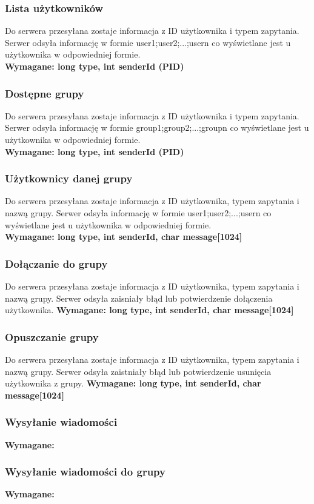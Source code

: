 \documentclass[11pt]{article}
\begin{document}
	\subsubsection{Lista użytkowników}
	Do serwera przesyłana zostaje informacja z ID użytkownika i typem zapytania. Serwer odsyła informację w formie user1;user2;...;usern co wyświetlane jest u użytkownika w odpowiedniej formie.\\
	\textbf{Wymagane: long type, int senderId (PID)}
	\subsubsection{Dostępne grupy}
	Do serwera przesyłana zostaje informacja z ID użytkownika i typem zapytania. Serwer odsyła informację w formie group1;group2;...;groupn co wyświetlane jest u użytkownika w odpowiedniej formie.\\
	\textbf{Wymagane: long type, int senderId (PID)}
	\subsubsection{Użytkownicy danej grupy}
	Do serwera przesyłana zostaje informacja z ID użytkownika, typem zapytania i nazwą grupy. Serwer odsyła informację w formie user1;user2;...;usern co wyświetlane jest u użytkownika w odpowiedniej formie.\\
	\textbf{Wymagane: long type, int senderId, char message[1024]}
	\subsubsection{Dołączanie do grupy}
	Do serwera przesyłana zostaje informacja z ID użytkownika, typem zapytania i nazwą grupy. Serwer odsyła zaisniały błąd lub potwierdzenie dołączenia użytkownika.
	\textbf{Wymagane: long type, int senderId, char message[1024]}
	\subsubsection{Opuszczanie grupy}
	Do serwera przesyłana zostaje informacja z ID użytkownika, typem zapytania i nazwą grupy. Serwer odsyła zaistniały błąd lub potwierdzenie usunięcia użytkownika z grupy.
	\textbf{Wymagane: long type, int senderId, char message[1024]}
	\subsubsection{Wysyłanie wiadomości}
	\textbf{Wymagane:}
	\subsubsection{Wysyłanie wiadomości do grupy}
	\textbf{Wymagane:}
\end{document}
